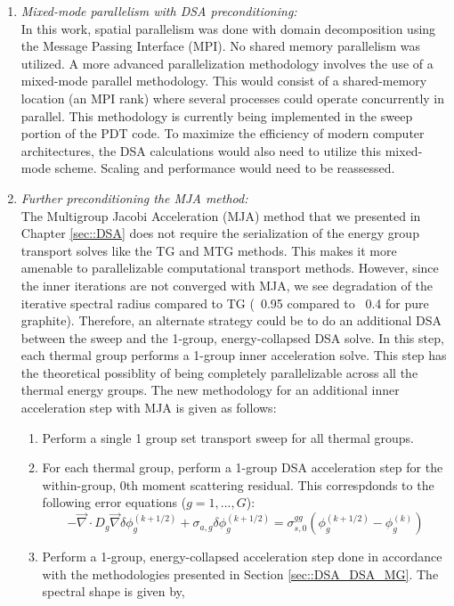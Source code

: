 \begin{enumerate}
\item {\em Mixed-mode parallelism with DSA preconditioning:} \\
In this work, spatial parallelism was done with domain decomposition using the Message Passing Interface (MPI). No shared memory parallelism was utilized. A more advanced parallelization methodology involves the use of a mixed-mode parallel methodology. This would consist of a shared-memory location (an MPI rank) where several processes could operate concurrently in parallel. This methodology is currently being implemented in the sweep portion of the PDT code. To maximize the efficiency of modern computer architectures, the DSA calculations would also need to utilize this mixed-mode scheme. Scaling and performance would need to be reassessed.
\item {\em Further preconditioning the MJA method:} \\
The Multigroup Jacobi Acceleration (MJA) method that we presented in Chapter \ref{sec::DSA} does not require the serialization of the energy group transport solves like the TG and MTG methods. This makes it more amenable to parallelizable computational transport methods. However, since the inner iterations are not converged with MJA, we see degradation of the iterative spectral radius compared to TG (~0.95 compared to ~0.4 for pure graphite). Therefore, an alternate strategy could be to do an additional DSA between the sweep and the 1-group, energy-collapsed DSA solve. In this step, each thermal group performs a 1-group inner acceleration solve. This step has the theoretical possiblity of being completely parallelizable across all the thermal energy groups. The new methodology for an additional inner acceleration step with MJA is given as follows:
	\begin{enumerate}
	\item Perform a single 1 group set transport sweep for all thermal groups.
	\item For each thermal group, perform a 1-group DSA acceleration step for the within-group, 0th moment scattering residual. This correspdonds to the following error equations ($g=1,...,G$):
	        \begin{equation*}
	        -\vec{\nabla} \cdot D_g \vec{\nabla} \delta \phi_g^{(k+1/2)} + \sigma_{a,g} \delta \phi_g^{(k+1/2)} = \sigma_{s,0}^{gg} \left( \phi_g^{(k+1/2)} - \phi_g^{(k)}\right)
	        \end{equation*}
	\item Perform a 1-group, energy-collapsed acceleration step done in accordance with the methodologies presented in Section \ref{sec::DSA_DSA_MG}. The spectral shape is given by,

\end{enumerate}
\end{enumerate}
